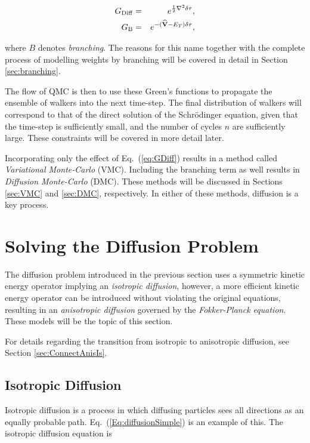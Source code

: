 \begin{eqnarray}
 G_\mathrm{Diff} &=& e^{\frac{1}{2}\nabla^2\delta\tau},\label{eq:GDiff} \\
 G_\mathrm{B} &=& e^{-({\bf\widehat{V}} - E_T)\delta\tau} \label{eq:GB},
\end{eqnarray}

where $B$ denotes \textit{branching}. The reasons for this name together with the complete process of modelling weights by branching will be covered in detail in Section \ref{sec:branching}.

The flow of QMC is then to use these Green's functions to propagate the ensemble of walkers into the next time-step. The final distribution of walkers will correspond to that of the direct solution of the Schrödinger equation, given that the time-step is sufficiently small, and the number of cycles $n$ are sufficiently large. These constraints will be covered in more detail later. 

Incorporating only the effect of Eq.~(\ref{eq:GDiff}) results in a method called \textit{Variational Monte-Carlo} (VMC). Including the branching term as well results in \textit{Diffusion Monte-Carlo} (DMC). These methods will be discussed in Sections \ref{sec:VMC} and \ref{sec:DMC}, respectively. In either of these methods, diffusion is a key process.

\section{Solving the Diffusion Problem}
\label{sec:solvingDiff}

The diffusion problem introduced in the previous section uses a symmetric kinetic energy operator implying an \textit{isotropic diffusion}, however, a more efficient kinetic energy operator can be introduced without violating the original equations, resulting in an \textit{anisotropic diffusion} governed by the \textit{Fokker-Planck equation}. These models will be the topic of this section. 

For details regarding the transition from isotropic to anisotropic diffusion, see Section \ref{sec:ConnectAnisIs}.

\subsection{Isotropic Diffusion}

Isotropic diffusion is a process in which diffusing particles sees all directions as an equally probable path. Eq.~(\ref{Eq:diffusionSimple}) is an example of this. The isotropic diffusion equation is  

